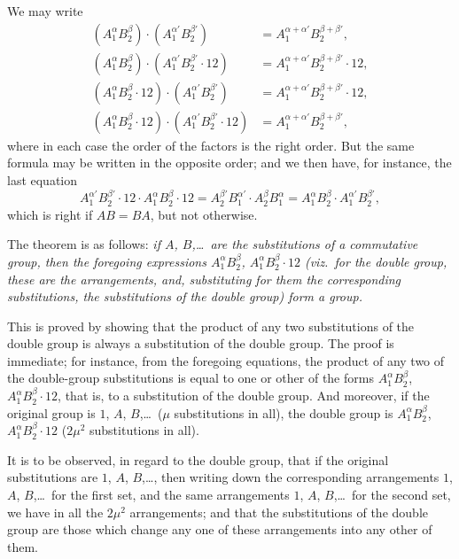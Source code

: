 \documentclass[11pt,a4paper]{book}
\begin{document}
We may write
\begin{align*}
(A_1^\alpha B_2^\beta) \cdot (A_1^{\alpha'} B_2^{\beta'}) &= A_1^{\alpha + \alpha'} B_2^{\beta + \beta'}, \\
(A_1^\alpha B_2^\beta) \cdot (A_1^{\alpha'} B_2^{\beta'} \cdot 12) &= A_1^{\alpha + \alpha'} B_2^{\beta + \beta'} \cdot 12, \\
(A_1^\alpha B_2^\beta \cdot 12) \cdot (A_1^{\alpha'} B_2^{\beta'}) &= A_1^{\alpha + \alpha'} B_2^{\beta + \beta'} \cdot 12, \\
(A_1^\alpha B_2^\beta \cdot 12) \cdot (A_1^{\alpha'} B_2^{\beta'} \cdot 12) &= A_1^{\alpha + \alpha'} B_2^{\beta + \beta'},
\end{align*}
where in each case the order of the factors is the right order. But the same formula may be written in the opposite order; and we then have, for instance, the last equation
\[
A_1^{\alpha'} B_2^{\beta'} \cdot 12 \cdot A_1^\alpha B_2^\beta \cdot 12 = A_2^{\beta'} B_1^{\alpha'} \cdot A_2^\beta B_1^\alpha = A_1^\alpha B_2^\beta \cdot A_1^{\alpha'} B_2^{\beta'},
\]
which is right if $AB = BA$, but not otherwise.

The theorem is as follows: \emph{if $A$, $B$,\ldots\ are the substitutions of a commutative group, then the foregoing expressions $A_1^\alpha B_2^\beta$, $A_1^\alpha B_2^\beta \cdot 12$ (viz.~for the double group, these are the arrangements, and, substituting for them the corresponding substitutions, the substitutions of the double group) form a group.}

This is proved by showing that the product of any two substitutions of the double group is always a substitution of the double group. The proof is immediate; for instance, from the foregoing equations, the product of any two of the double-group substitutions is equal to one or other of the forms $A_1^\alpha B_2^\beta$, $A_1^\alpha B_2^\beta \cdot 12$, that is, to a substitution of the double group. And moreover, if the original group is $1$, $A$, $B$,\ldots\ ($\mu$ substitutions in all), the double group is $A_1^\alpha B_2^\beta$, $A_1^\alpha B_2^\beta \cdot 12$ ($2\mu^2$ substitutions in all).

It is to be observed, in regard to the double group, that if the original substitutions are $1$, $A$, $B$,\ldots, then writing down the corresponding arrangements $1$, $A$, $B$,\ldots\ for the first set, and the same arrangements $1$, $A$, $B$,\ldots\ for the second set, we have in all the $2\mu^2$ arrangements; and that the substitutions of the double group are those which change any one of these arrangements into any other of them.
\end{document}
